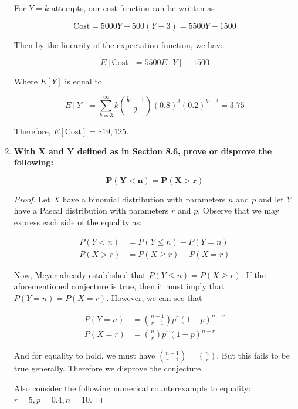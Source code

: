 \documentclass[10pt, oneside]{article}   	%
\theoremstyle{definition}
\begin{document}
\begin{enumerate}[label=8.\arabic*]
For $Y = k$ attempts, our cost function can be written as

\[ \text{Cost} = 5000Y + 500(Y - 3) = 5500Y - 1500 \]

Then by the linearity of the expectation function, we have

\[ E[\text{Cost}] = 5500 E[Y] - 1500 \]

Where $E[Y]$ is equal to

\[ E[Y] = \sum^{\infty}_{k=3} k \binom{k-1}{2} (0.8)^3 (0.2)^{k-3} = 3.75 \]

Therefore, $\boxed{E[\text{Cost}] = \$ 19,125}$.

\item  \begin{tcolorbox}[
  colback=Cerulean!5!white,
  colframe=Cerulean!75!black]
\textbf{With $\bm{X}$ and $\bm{Y}$ defined as in Section 8.6, prove or disprove the following:}

\[ \bm{P(Y < n) = P(X > r)} \]
\end{tcolorbox}

\begin{proof}
Let $X$ have a binomial distribution with parameters $n$ and $p$ and let $Y$ have a Pascal distribution with parameters $r$ and $p$. Observe that we may express each side of the equality as:

\begin{align*}
P(Y < n) &= P(Y \leq n) - P(Y = n) \\
P(X > r) &= P(X \geq r) - P(X = r)
\end{align*}

Now, Meyer already established that $P(Y \leq n) = P(X \geq r)$. If the aforementioned conjecture is true, then it must imply that $P(Y = n) = P(X = r)$. However, we can see that

\begin{align*}
P(Y = n) &= \binom{n-1}{r-1} p^r (1-p)^{n-r} \\
P(X = r) &= \binom{n}{r} p^r (1-p)^{n-r}
\end{align*}

And for equality to hold, we must have $\binom{n-1}{r-1} = \binom{n}{r}$. But this fails to be true generally. Therefore we $\boxed{\text{disprove}}$ the conjecture.

Also consider the following numerical counterexample to equality: $r = 5, p = 0.4, n = 10$.
\end{proof}

\end{enumerate}
\end{document}
